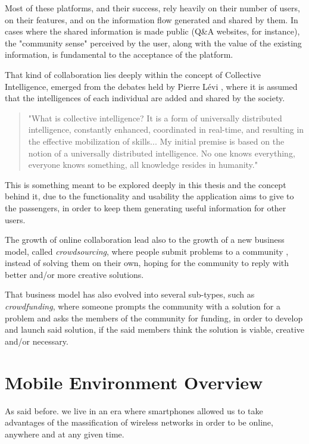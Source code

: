 Most of these platforms, and their success, rely heavily on their number of users, on their features, and on the information flow generated and shared by them. In cases where the shared information is made public (Q\&A websites, for instance), the "community sense" perceived by the user, along with the value of the existing information, is fundamental to the acceptance of the platform.

That kind of collaboration lies deeply within the concept of Collective Intelligence, emerged from the debates held by Pierre Lévi \cite{kn:Le98}, where it is assumed that the intelligences of each individual are added and shared by the society.

\begin{quote}
"What is collective intelligence? It is a form of universally distributed intelligence, constantly enhanced, coordinated in real-time, and resulting in the effective mobilization of skills... My initial premise is based on the notion of a universally distributed intelligence. No one knows everything, everyone knows something, all knowledge resides in humanity." 
\end{quote}

This is something meant to be explored deeply in this thesis and the concept behind it, due to the functionality and usability the application aims to give to the passengers, in order to keep them generating useful information for other users.

The growth of online collaboration lead also to the growth of a new business model, called \emph{crowdsourcing}, where people submit problems to a community , instead of solving them on their own, hoping for the community to reply with better and/or more creative solutions.

That business model has also evolved into several sub-types, such as \emph{crowdfunding}, where someone prompts the community with a solution for a problem and asks the members of the community for funding, in order to develop and launch said solution, if the said members think the solution is viable, creative and/or necessary.

\section{Mobile Environment Overview}\label{sec:mobove}

As said before. we live in an era where smartphones allowed us to take advantages of the massification of wireless networks in order to be online, anywhere and at any given time.

